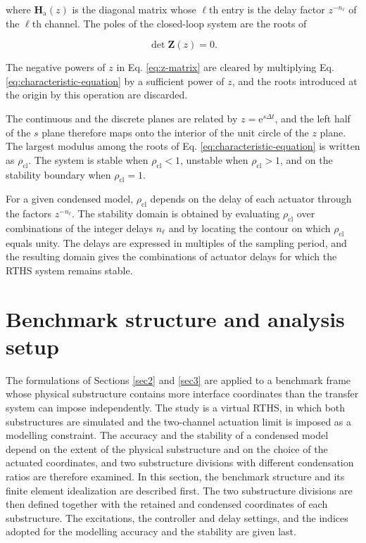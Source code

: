 \documentclass[a4paper,fleqn,review,12pt]{cas-sc}
\numberwithin{equation}{section}
\begin{document}
\noindent where \(\mathbf{H}_{\mathrm{a}}(z)\) is the diagonal matrix whose \(\ell\)th entry is the delay factor \(z^{-n_{\ell}}\) of the \(\ell\)th channel. The poles of the closed-loop system are the roots of

\vspace{-3.5em}
\begin{equation}
	\det\mathbf{Z}(z)=0.
	\label{eq:characteristic-equation}
\end{equation}
\vspace{-3.5em}

The negative powers of \(z\) in Eq. \eqref{eq:z-matrix} are cleared by multiplying Eq. \eqref{eq:characteristic-equation} by a sufficient power of \(z\), and the roots introduced at the origin by this operation are discarded.

The continuous and the discrete planes are related by \(z=\mathrm{e}^{s\Delta t}\), and the left half of the \(s\) plane therefore maps onto the interior of the unit circle of the \(z\) plane. The largest modulus among the roots of Eq. \eqref{eq:characteristic-equation} is written as \(\rho_{\mathrm{cl}}\). The system is stable when \(\rho_{\mathrm{cl}}<1\), unstable when \(\rho_{\mathrm{cl}}>1\), and on the stability boundary when \(\rho_{\mathrm{cl}}=1\).

For a given condensed model, \(\rho_{\mathrm{cl}}\) depends on the delay of each actuator through the factors \(z^{-n_{\ell}}\). The stability domain is obtained by evaluating \(\rho_{\mathrm{cl}}\) over combinations of the integer delays \(n_{\ell}\) and by locating the contour on which \(\rho_{\mathrm{cl}}\) equals unity. The delays are expressed in multiples of the sampling period, and the resulting domain gives the combinations of actuator delays for which the RTHS system remains stable.




\section{Benchmark structure and analysis setup} \label{sec4}

The formulations of Sections \ref{sec2} and \ref{sec3} are applied to a benchmark frame whose physical substructure contains more interface coordinates than the transfer system can impose independently. The study is a virtual RTHS, in which both substructures are simulated and the two-channel actuation limit is imposed as a modelling constraint. The accuracy and the stability of a condensed model depend on the extent of the physical substructure and on the choice of the actuated coordinates, and two substructure divisions with different condensation ratios are therefore examined. In this section, the benchmark structure and its finite element idealization are described first. The two substructure divisions are then defined together with the retained and condensed coordinates of each substructure. The excitations, the controller and delay settings, and the indices adopted for the modelling accuracy and the stability are given last.
\end{document}
